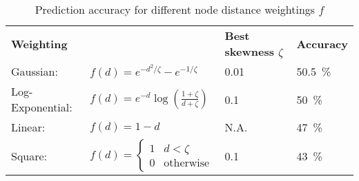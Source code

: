 \begin{table}[H]
\caption{Prediction accuracy for different node distance weightings $f$}
\begin{center}
\begin{tabular}{l l l l}
\multicolumn{2}{l}{
\textbf{Weighting}}														& \textbf{Best skewness $\zeta$}		& \textbf{Accuracy}\\

Gaussian:			& $f(d)=e^{-d^2/\zeta}-e^{-1/\zeta}$							& \SI{0.01}{}						&\SI{50.5}{\percent} \\

Log-Exponential:	& $f(d)=e^{-d} \log\left( \frac{1+\zeta}{d+\zeta}\right)$				&\SI{0.1}{}							& \SI{50}{\percent} \\ 

Linear:			& $f(d)=1-d$											& N.A. 							&\SI{47}{\percent} \\

Square:			&$f(d)= \begin{cases}
1				&d < \zeta \\
0				& \text{otherwise}
				\end{cases}$											& \SI{0.1}{}						& \SI{43}{\percent}
\end{tabular}
\end{center}
\label{tab:Prediction accuracy for different node distance weightings}
\end{table}